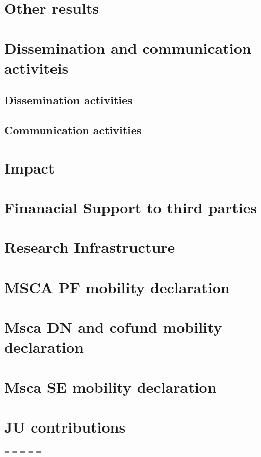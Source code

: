 \section{Other results}

\section{Dissemination and communication activiteis}

\subsection{Dissemination activities}

\subsection{Communication activities}

\section{Impact}

\section{Finanacial Support to third parties}

\section{Research Infrastructure}

\section{MSCA PF mobility declaration}

\section{Msca DN and cofund mobility declaration}

\section{Msca SE mobility declaration}

\section{JU contributions}

\endgroup

\newpage
\paperwidth=\pdfpageheight
\paperheight=\pdfpagewidth
\pdfpageheight=\paperheight
\pdfpagewidth=\paperwidth
\headwidth=\textwidth


\pagestyle{plain} %
